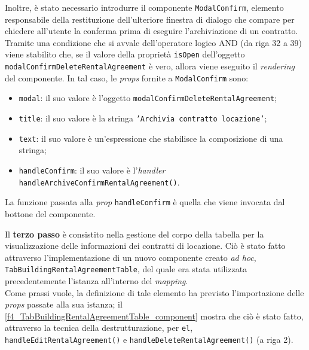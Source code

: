 Inoltre, è stato necessario introdurre il componente \texttt{ModalConfirm}, elemento responsabile della restituzione dell'ulteriore finestra di dialogo che compare per chiedere all'utente la conferma prima di eseguire l'archiviazione di un contratto.\\
Tramite una condizione che si avvale dell'operatore logico AND (da riga 32 a 39) viene stabilito che, se il valore della proprietà \texttt{isOpen} dell'oggetto \\\texttt{modalConfirmDeleteRentalAgreement} è vero, allora viene eseguito il \textit{rendering} del componente. In tal caso, le \textit{props} fornite a \texttt{ModalConfirm} sono: 
\begin{itemize}
    \item \texttt{modal}: il suo valore è l'oggetto \texttt{modalConfirmDeleteRentalAgreement};
    \item \texttt{title}: il suo valore è la stringa \texttt{'Archivia contratto locazione'};
    \item \texttt{text}: il suo valore è un'espressione che stabilisce la composizione di una stringa; 
    \item \texttt{handleConfirm}: il suo valore è l'\textit{handler} \texttt{handleArchiveConfirmRentalAgreement()}.
\end{itemize}
La funzione passata alla \textit{prop} \texttt{handleConfirm} è quella che viene invocata dal bottone del componente.



Il \textbf{terzo passo} è consistito nella gestione del corpo della tabella per la visualizzazione delle informazioni dei contratti di locazione. 
Ciò è stato fatto attraverso l'implementazione di un nuovo componente creato \textit{ad hoc}, \texttt{TabBuildingRentalAgreementTable}, del quale era stata utilizzata precedentemente l'istanza all'interno del \textit{mapping}.\\
Come prassi vuole, la definizione di tale elemento ha previsto l'importazione delle \textit{props} passate alla sua istanza; il \autoref{f4_TabBuildingRentalAgreementTable_component} mostra che ciò è stato fatto, attraverso la tecnica della destrutturazione, per \texttt{el}, \texttt{handleEditRentalAgreement()} e \texttt{handleDeleteRentalAgreement()} (a riga 2).



